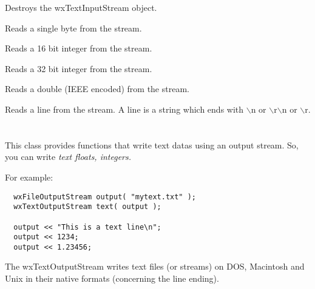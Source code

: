 Destroys the wxTextInputStream object.



Reads a single byte from the stream.



Reads a 16 bit integer from the stream.



Reads a 32 bit integer from the stream.



Reads a double (IEEE encoded) from the stream.



Reads a line from the stream. A line is a string which ends with
$\backslash$n or $\backslash$r$\backslash$n or $\backslash$r.


\section{}\label{wxtextoutputstream}

This class provides functions that write text datas using an output stream.
So, you can write \it{text} floats, integers.

For example:
\begin{verbatim}
  wxFileOutputStream output( "mytext.txt" );
  wxTextOutputStream text( output );

  output << "This is a text line\n";
  output << 1234;
  output << 1.23456;
\end{verbatim}

The wxTextOutputStream writes text files (or streams) on DOS, Macintosh
and Unix in their native formats (concerning the line ending).


